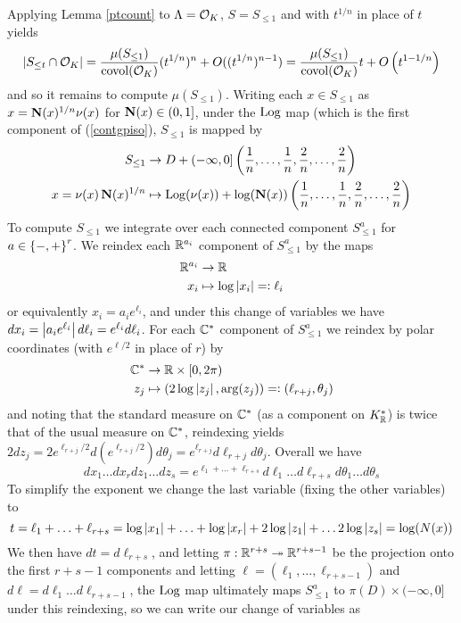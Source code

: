 \documentclass[11pt]{report}
\begin{document}
Applying Lemma \ref{ptcount} to $\Lambda = \mathcal{O}_K$, $S = S_{\leq 1}$ and with $t^{1/n}$ in place of $t$ yields
\begin{align}
    \left| S_{\leq t} \cap \mathcal{O}_K \right| = \frac{\mu(S_{\leq 1})}{\operatorname{covol}(\mathcal{O}_K)}(t^{1/n})^n + O((t^{1/n})^{n - 1}) = \frac{\mu(S_{\leq 1})}{\operatorname{covol}(\mathcal{O}_K)}t + O\left(  t^{1 - 1/n}  \right)
\end{align}
and so it remains to compute $\mu(S_{\leq 1})$. Writing each $x \in S_{\leq 1}$ as $x = \operatorname{\mathbf{N}}(x)^{1/n}\nu(x)$ for $\operatorname{\mathbf{N}}(x) \in (0, 1]$, under the $\operatorname{Log}$ map (which is the first component of (\ref{contgpiso}), $S_{\leq 1}$ is mapped by
\begin{align*}
    S_{\leq 1} &\to D + (-\infty, 0]\left(  \frac1n, \ldots, \frac1n, \frac2n, \ldots, \frac2n  \right) \\
    x = \nu(x)\operatorname{\mathbf{N}}(x)^{1/n} &\mapsto \operatorname{Log}(\nu(x)) + \log(\operatorname{\mathbf{N}}(x))\left(  \frac1n, \ldots, \frac1n, \frac2n, \ldots, \frac2n  \right)
\end{align*}
To compute $S_{\leq 1}$ we integrate over each connected component $S_{\leq 1}^a$ for $a \in \left\{  -, +  \right\}^r$. We reindex each $\mathbb{R}^{a_i}$ component of $S_{\leq 1}^a$ by the maps
\begin{align*}
    \mathbb{R}^{a_i} &\to \mathbb{R} \\
    x_i &\mapsto \log\left| x_i \right| =\vcentcolon \ell_i
\end{align*}
or equivalently $x_i = a_ie^{\ell_i}$, and under this change of variables we have $dx_i = \left| a_ie^{\ell_i} \right|d\ell_i = e^{\ell_i}d\ell_i$. For each $\mathbb{C}^*$ component of $S_{\leq 1}^a$ we reindex by polar coordinates (with $e^{\ell/2}$ in place of $r$) by
\begin{align*}
    \mathbb{C}^* &\to \mathbb{R} \times [0, 2\pi) \\
    z_j &\mapsto (2\log\left| z_j \right|, \arg(z_j)) =\vcentcolon (\ell_{r + j}, \theta_j)
\end{align*}
and noting that the standard measure on $\mathbb{C}^*$ (as a component on $K_{\mathbb{R}}^*$) is twice that of the usual measure on $\mathbb{C}^*$, reindexing yields $2dz_j = 2e^{\ell_{r + j}/2}d(e^{\ell_{r + j}/2})d\theta_j = e^{\ell_{r + j}}d\ell_{r + j}d\theta_j$. Overall we have
$$
    dx_1 \ldots dx_r dz_1 \ldots dz_s = e^{\ell_1 + \ldots + \ell_{r + s}}d\ell_1 \ldots d\ell_{r + s}d\theta_1 \ldots d\theta_s
$$
To simplify the exponent we change the last variable (fixing the other variables) to 
$$
    t = \ell_1 + \ldots + \ell_{r + s} = \log\left| x_1 \right| + \ldots + \log\left| x_r \right| + 2\log\left| z_1 \right| + \ldots 2\log\left| z_s \right| = \log(N(x))
$$
We then have $dt = d\ell_{r + s}$, and letting $\pi : \mathbb{R}^{r + s} \twoheadrightarrow \mathbb{R}^{r + s - 1}$ be the projection onto the first $r + s - 1$ components and letting $\ell = (\ell_1, \ldots, \ell_{r + s - 1})$ and $d\ell = d\ell_1 \ldots d\ell_{r + s - 1}$, the $\operatorname{Log}$ map ultimately maps $S_{\leq 1}^a$ to $\pi(D) \times (-\infty, 0]$ under this reindexing, so we can write our change of variables as
\end{document}
